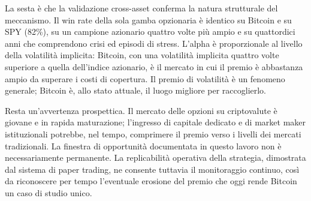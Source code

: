 La sesta è che la validazione cross-asset conferma la natura strutturale del
meccanismo. Il win rate della sola gamba opzionaria è identico su Bitcoin e
su SPY (82\%), su un campione azionario quattro volte più ampio e su
quattordici anni che comprendono crisi ed episodi di stress. L'alpha è
proporzionale al livello della volatilità implicita: Bitcoin, con una
volatilità implicita quattro volte superiore a quella dell'indice azionario,
è il mercato in cui il premio è abbastanza ampio da superare i costi di
copertura. Il premio di volatilità è un fenomeno generale; Bitcoin è, allo
stato attuale, il luogo migliore per raccoglierlo.

Resta un'avvertenza prospettica. Il mercato delle opzioni su criptovalute è
giovane e in rapida maturazione; l'ingresso di capitale dedicato e di market
maker istituzionali potrebbe, nel tempo, comprimere il premio verso i livelli
dei mercati tradizionali. La finestra di opportunità documentata in questo
lavoro non è necessariamente permanente. La replicabilità operativa della
strategia, dimostrata dal sistema di paper trading, ne consente tuttavia il
monitoraggio continuo, così da riconoscere per tempo l'eventuale erosione del
premio che oggi rende Bitcoin un caso di studio unico.

